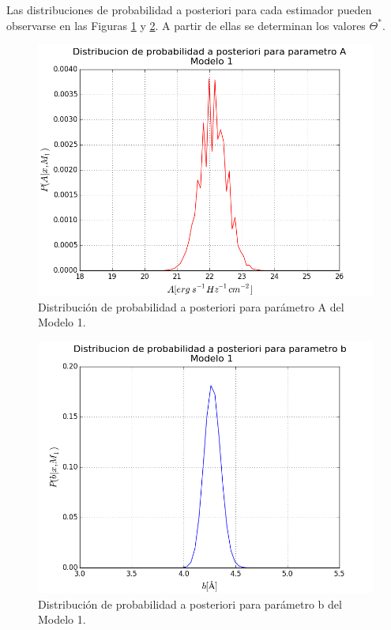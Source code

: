 \documentclass{article}
\begin{document}
Las distribuciones de probabilidad a posteriori para cada estimador pueden observarse en las Figuras \ref{fig:distr_A_modelo1} y \ref{fig:distr_b_modelo1}. A partir de ellas se determinan los valores $\Theta^*$.

\begin{figure}[h!]
  \centering
  \includegraphics[scale = 0.5]{images/distr_A_modelo1.png}
  \caption{Distribución de probabilidad a posteriori para parámetro A del Modelo 1.}
  \label{fig:distr_A_modelo1}
\end{figure}

\begin{figure}[h!]
  \centering
  \includegraphics[scale = 0.5]{images/distr_b_modelo1.png}
  \caption{Distribución de probabilidad a posteriori para parámetro b del Modelo 1.}
  \label{fig:distr_b_modelo1}
\end{figure}
\end{document}
